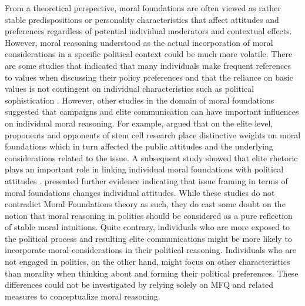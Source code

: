 \documentclass[12pt]{article}
\begin{document}
From a theoretical perspective, moral foundations are often viewed as rather stable predispositions or personality characteristics that affect attitudes and preferences regardless of potential individual moderators and contextual effects. However, moral reasoning understood as the actual incorporation of moral considerations in a specific political context could be much more volatile. There are some studies that indicated that many individuals make frequent references to values when discussing their policy preferences \citep{feldman1992political} and that the reliance on basic values is not contingent on individual characteristics such as political sophistication \citep[e.g.][]{goren2001core,goren2004political,marietta2007values}. However, other studies in the domain of moral foundations suggested that campaigns and elite communication can have important influences on individual moral reasoning. For example, \citet{clifford2013words} argued that on the elite level, proponents and opponents of stem cell research place distinctive weights on moral foundations which in turn affected the public attitudes and the underlying considerations related to the issue. A subsequent study showed that elite rhetoric plays an important role in linking individual moral foundations with political attitudes \citep{clifford2015concerns}. \citet{day2014shifting} presented further evidence indicating that issue framing in terms of moral foundations changes individual attitudes. While these studies do not contradict Moral Foundations theory as such, they do cast some doubt on the notion that moral reasoning in politics should be considered as a pure reflection of stable moral intuitions. Quite contrary, individuals who are more exposed to the political process and resulting elite communications might be more likely to incorporate moral considerations in their political reasoning. Individuals who are not engaged in politics, on the other hand, might focus on other characteristics than morality when thinking about and forming their political preferences. These differences could not be investigated by relying solely on MFQ and related measures to conceptualize moral reasoning.
\end{document}
